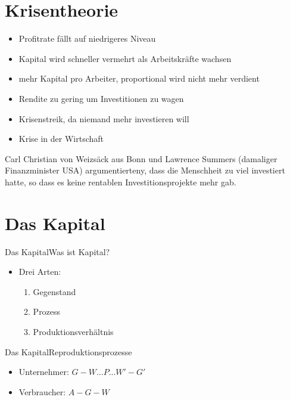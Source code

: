 \documentclass[10pt,a4paper, ngerman]{beamer}
\begin{document}
\section{Krisentheorie}
\begin{frame}
  \begin{itemize}
      \item Profitrate fällt auf niedrigeres Niveau
      \pause
      \item Kapital wird schneller vermehrt als Arbeitskräfte wachsen
      \pause
      \item mehr Kapital pro Arbeiter, proportional wird nicht mehr verdient
      \pause
      \item Rendite zu gering um Investitionen zu wagen
      \pause
      \item Krisenstreik, da niemand mehr investieren will
      \pause
      \item Krise in der Wirtschaft
  \end{itemize}
\end{frame}

\begin{frame}
  Carl Christian von Weizsäck aus Bonn und Lawrence Summers (damaliger Finanzminister USA)
  argumentierteny, dass die Menschheit zu viel investiert hatte,
  so dass es keine rentablen Investitionsprojekte mehr gab.
\end{frame}

\section{Das Kapital}
\begin{frame}[fragile]{Das Kapital}{Was ist Kapital?}
\begin{itemize}
	\item Drei Arten:
	\begin{enumerate}
		\item Gegenstand
		\item Prozess
		\item Produktionsverhältnis
	\end{enumerate}
\end{itemize}
\end{frame}

\begin{frame}[fragile]{Das Kapital}{Reproduktionsprozesse}
\begin{itemize}
	\item Unternehmer: \(G - W ... P ... W' - G'\) \pause
	\item Verbraucher: \(A - G - W\)
\end{itemize}
\end{frame}
\end{document}
